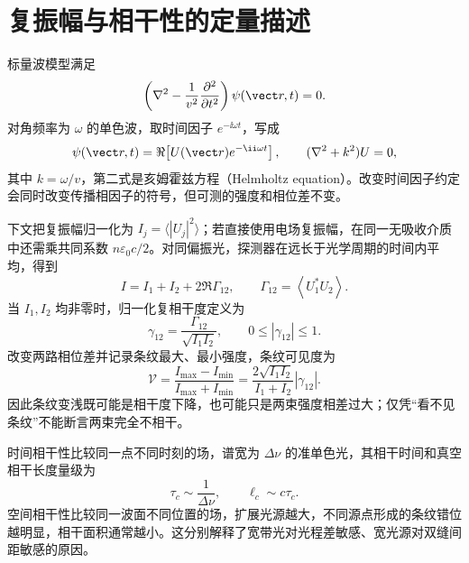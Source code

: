 \section{复振幅与相干性的定量描述}

标量波模型满足
\begin{equation}
 \left(\nabla^2-\frac1{v^2}\frac{\partial^2}{\partial t^2}\right)\psi(\vect r,t)=0.
\end{equation}
对角频率为 $\omega$ 的单色波，取时间因子 $e^{-\ii\omega t}$，写成
\begin{equation}
 \psi(\vect r,t)=\Re\!\left[U(\vect r)e^{-\ii\omega t}\right],
 \qquad (\nabla^2+k^2)U=0,
\end{equation}
其中 $k=\omega/v$，第二式是亥姆霍兹方程（Helmholtz equation）。改变时间因子约定会同时改变传播相因子的符号，但可测的强度和相位差不变。

下文把复振幅归一化为 $I_j=\langle|U_j|^2\rangle$；若直接使用电场复振幅，在同一无吸收介质中还需乘共同系数 $n\varepsilon_0c/2$。对同偏振光，探测器在远长于光学周期的时间内平均，得到
\begin{equation}
 I=I_1+I_2+2\Re\Gamma_{12},
 \qquad
 \Gamma_{12}=\left\langle U_1^*U_2\right\rangle.
\end{equation}
当 $I_1,I_2$ 均非零时，归一化复相干度定义为
\begin{equation}
 \gamma_{12}=\frac{\Gamma_{12}}{\sqrt{I_1I_2}},
 \qquad 0\le |\gamma_{12}|\le1.
\end{equation}
改变两路相位差并记录条纹最大、最小强度，条纹可见度为
\begin{equation}
 \mathcal V=\frac{I_{\max}-I_{\min}}{I_{\max}+I_{\min}}
 =\frac{2\sqrt{I_1I_2}}{I_1+I_2}|\gamma_{12}|.
\end{equation}
因此条纹变浅既可能是相干度下降，也可能只是两束强度相差过大；仅凭“看不见条纹”不能断言两束完全不相干。

时间相干性比较同一点不同时刻的场，谱宽为 $\Delta\nu$ 的准单色光，其相干时间和真空相干长度量级为
\begin{equation}
 \tau_c\sim\frac1{\Delta\nu},
 \qquad \ell_c\sim c\tau_c.
\end{equation}
空间相干性比较同一波面不同位置的场，扩展光源越大，不同源点形成的条纹错位越明显，相干面积通常越小。这分别解释了宽带光对光程差敏感、宽光源对双缝间距敏感的原因。

